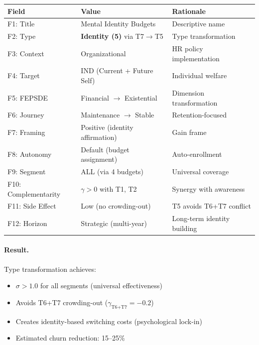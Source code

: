 \begin{table}[htbp]
\centering
\small
\begin{tabular}{@{}lll@{}}
\toprule
\textbf{Field} & \textbf{Value} & \textbf{Rationale} \\
\midrule
F1: Title & Mental Identity Budgets & Descriptive name \\
F2: Type & \textbf{Identity (5)} via T7$\rightarrow$T5 & Type transformation \\
F3: Context & Organizational & HR policy implementation \\
F4: Target & IND (Current + Future Self) & Individual welfare \\
F5: FEPSDE & Financial $\rightarrow$ Existential & Dimension transformation \\
F6: Journey & Maintenance $\rightarrow$ Stable & Retention-focused \\
F7: Framing & Positive (identity affirmation) & Gain frame \\
F8: Autonomy & Default (budget assignment) & Auto-enrollment \\
F9: Segment & ALL (via 4 budgets) & Universal coverage \\
F10: Complementarity & $\gamma > 0$ with T1, T2 & Synergy with awareness \\
F11: Side Effect & Low (no crowding-out) & T5 avoids T6+T7 conflict \\
F12: Horizon & Strategic (multi-year) & Long-term identity building \\
\bottomrule
\end{tabular}
\end{table}

\paragraph{Result.} Type transformation achieves:
\begin{itemize}[nosep]
    \item $\sigma > 1.0$ for all segments (universal effectiveness)
    \item Avoids T6+T7 crowding-out ($\gamma_{\text{T6+T7}} = -0.2$)
    \item Creates identity-based switching costs (psychological lock-in)
    \item Estimated churn reduction: 15--25\%
\end{itemize}

